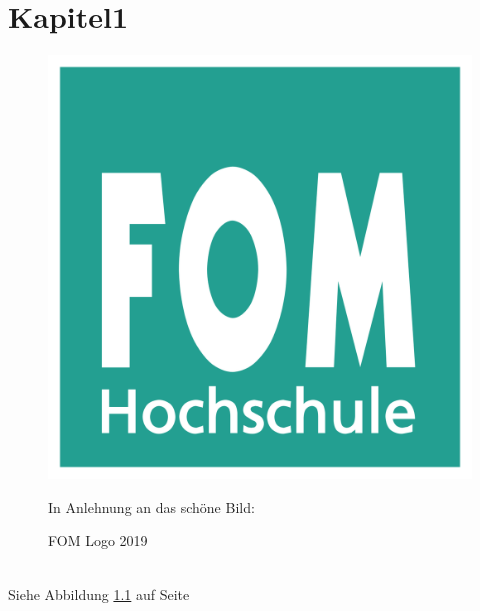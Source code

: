 \chapter{Kapitel1}
\blindtext{}\autocite{elk}

\begin{figure}[!htb] 
   \centering 
   \begin{minipage}{8cm} 
   \caption{FOM Logo 2019} 
   \label{fig:fom_logo} 
   \includegraphics[width=\textwidth]{Abbildungen/fom_logo.png} 
   \par\smallskip 
   In Anlehnung an das schöne Bild: \cite[12]{elk}
   \end{minipage} 
\end{figure} 

\blindtext[12]{}\\
Siehe Abbildung \ref{fig:fom_logo} auf Seite \pageref{fig:fom_logo}
